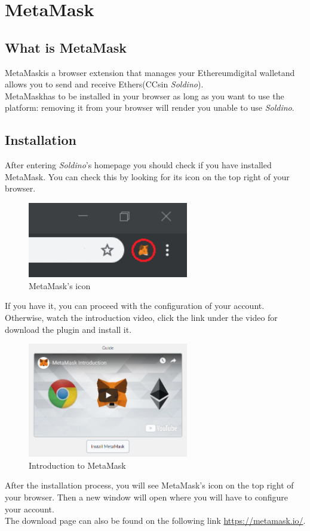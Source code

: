 \section{MetaMask}
	\subsection{What is MetaMask}
	MetaMask\glosp is a browser extension that manages your Ethereum\glosp digital wallet\glosp and 
	allows you to send and receive Ethers\glosp (CCs\glosp in \textit{Soldino}). 
	\\
	MetaMask\glosp has to be installed in your browser as long as you want 
	to use the platform: removing it from your browser will render you unable 
	to use \textit{Soldino}.
	\subsection{Installation}
	After entering \textit{Soldino}'s homepage you should check if you have installed MetaMask\glo{}. You can check this by looking for its icon on the top right of your browser.
	\begin{figure}[H]
		\includegraphics[width=7cm]{res/images/metamask_icon.png}
		\centering
		\caption{MetaMask's icon}
	\end{figure}
	\noindent If you have it, you can proceed with the configuration of your account.
	Otherwise, watch the introduction video, click the link under the video for download the plugin and install it. 
	\begin{figure}[H]
		\includegraphics[width=7cm]{res/images/metamask_download.png}
		\centering
		\caption{Introduction to MetaMask}
	\end{figure}
	\noindent After the installation process, you will see MetaMask\glo's icon on the top right of your browser. Then 
	a new window will open where you will have to configure your account.\\
	The download page can also be found on the following link \url{https://metamask.io/}.
